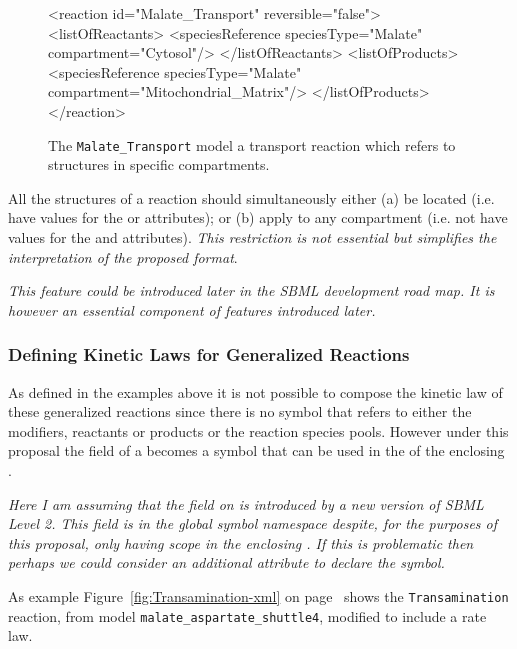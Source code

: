 \documentclass{cekarticle}
\begin{document}
\begin{figure}[h]
\begin{example}
<reaction id="Malate_Transport" reversible="false">
    <listOfReactants>
        <speciesReference speciesType="Malate" compartment="Cytosol"/>
    </listOfReactants>
    <listOfProducts>
        <speciesReference speciesType="Malate" compartment="Mitochondrial_Matrix"/>
    </listOfProducts>
</reaction>
\end{example}
\caption{The \texttt{Malate\_Transport} model a transport reaction which refers to 
structures in specific compartments.}
\label{fig:Malate_Transport-xml}
\end{figure}

All the  structures of a reaction
should simultaneously either (a) be located (i.e. have values for
the  or  attributes); or (b)
apply to any compartment (i.e. not have values for the
 and  attributes). \emph{This
restriction is not essential but simplifies the interpretation of
the proposed format}.

\emph{This feature could be introduced later in the SBML
development road map. It is however an essential component of
features introduced later.}

\subsubsection{Defining Kinetic Laws for Generalized Reactions}

As defined in the examples above it is not possible to compose the kinetic law of these generalized
reactions since there is no symbol that refers to either the modifiers, reactants or products or the
reaction species pools.  However under this proposal the  field of a
 becomes a symbol that can be used in the  of the
enclosing .

\emph{Here I am assuming that the  field on  is introduced by a
new version of SBML Level 2. This  field is in the global symbol
namespace despite, for the purposes of this proposal, only having scope in the enclosing
.  If this is problematic then perhaps we could consider an additional attribute to
declare the symbol.}

As example Figure~\ref{fig:Transamination-xml} on
page~\pageref{fig:Transamination-xml} shows the
\texttt{Transamination} reaction, from model
\texttt{malate\_aspartate\_shuttle4}, modified to include a rate
law.
\end{document}

